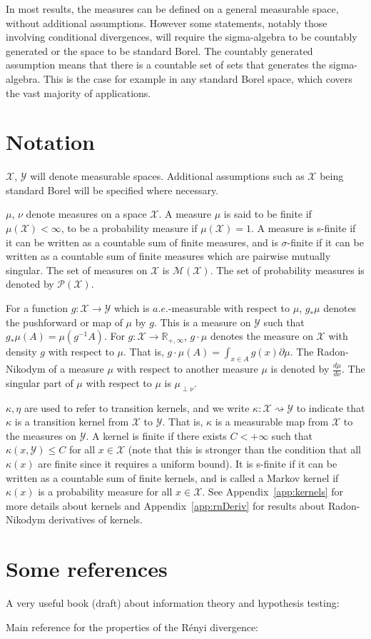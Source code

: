 In most results, the measures can be defined on a general measurable space, without additional assumptions.
However some statements, notably those involving conditional divergences, will require the sigma-algebra to be countably generated or the space to be standard Borel.
The countably generated assumption means that there is a countable set of sets that generates the sigma-algebra.
This is the case for example in any standard Borel space, which covers the vast majority of applications.



\section*{Notation}

$\mathcal X$, $\mathcal Y$ will denote measurable spaces. Additional assumptions such as $\mathcal X$ being standard Borel will be specified where necessary.

$\mu$, $\nu$ denote measures on a space $\mathcal X$. A measure $\mu$ is said to be finite if $\mu(\mathcal X) < \infty$, to be a probability measure if $\mu(\mathcal X) = 1$. A measure is s-finite if it can be written as a countable sum of finite measures, and is $\sigma$-finite if it can be written as a countable sum of finite measures which are pairwise mutually singular.
The set of measures on $\mathcal X$ is $\mathcal M(\mathcal X)$. The set of probability measures is denoted by $\mathcal P(\mathcal X)$.

For a function $g : \mathcal X \to \mathcal Y$ which is $a.e.$-measurable with respect to $\mu$, $g_* \mu$ denotes the pushforward or map of $\mu$ by $g$. This is a measure on $\mathcal Y$ such that $g_* \mu (A) = \mu(g^{-1} A)$.
For $g : \mathcal X \to \mathbb{R}_{+,\infty}$, $g \cdot \mu$ denotes the measure on $\mathcal X$ with density $g$ with respect to $\mu$. That is, $g \cdot \mu (A) = \int_{x \in A} g(x) \partial\mu$.
The Radon-Nikodym of a measure $\mu$ with respect to another measure $\mu$ is denoted by $\frac{d\mu}{d\nu}$. The singular part of $\mu$ with respect to $\mu$ is $\mu_{\perp \nu}$.

$\kappa, \eta$ are used to refer to transition kernels, and we write $\kappa : \mathcal X \rightsquigarrow \mathcal Y$ to indicate that $\kappa$ is a transition kernel from $\mathcal X$ to $\mathcal Y$. That is, $\kappa$ is a measurable map from $\mathcal X$ to the measures on $\mathcal Y$.
A kernel is finite if there exists $C < + \infty$ such that $\kappa(x, \mathcal Y) \le C$ for all $x \in \mathcal X$ (note that this is stronger than the condition that all $\kappa(x)$ are finite since it requires a uniform bound). It is s-finite if it can be written as a countable sum of finite kernels, and is called a Markov kernel if $\kappa(x)$ is a probability measure for all $x \in \mathcal X$.
See Appendix~\ref{app:kernels} for more details about kernels and Appendix~\ref{app:rnDeriv} for results about Radon-Nikodym derivatives of kernels.



\section*{Some references}

A very useful book (draft) about information theory and hypothesis testing: \cite{polyanskiy2024information} 

Main reference for the properties of the Rényi divergence: \cite{van2014renyi}
